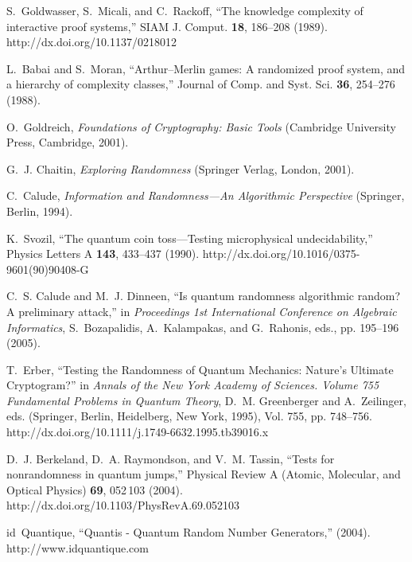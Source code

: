 \documentclass[12pt]{article}
\begin{document}
\begin{thebibliography}{10}
S.~Goldwasser, S.~Micali, and C.~Rackoff, \enquote{The knowledge complexity of
  interactive proof systems,} SIAM J. Comput. {\bf 18}, 186--208 (1989).
\newline http://dx.doi.org/10.1137/0218012

L.~Babai and S.~Moran, \enquote{Arthur--Merlin games: A randomized proof
  system, and a hierarchy of complexity classes,} Journal of Comp. and Syst.
  Sci. {\bf 36}, 254--276 (1988).

O.~Goldreich, {\em Foundations of Cryptography: Basic Tools\/} (Cambridge
  University Press, Cambridge, 2001).

G.~J. Chaitin, {\em Exploring Randomness\/} (Springer Verlag, London, 2001).

C.~Calude, {\em Information and Randomness---An Algorithmic Perspective\/}
  (Springer, Berlin, 1994).

K.~Svozil, \enquote{The quantum coin toss---Testing microphysical
  undecidability,} Physics Letters A {\bf 143}, 433--437 (1990).
\newline http://dx.doi.org/10.1016/0375-9601(90)90408-G

C.~S. Calude and M.~J. Dinneen, \enquote{Is quantum randomness algorithmic
  random? A preliminary attack,} in {\em Proceedings 1st International
  Conference on Algebraic Informatics\/}, S.~Bozapalidis, A.~Kalampakas, and
  G.~Rahonis, eds.,  pp. 195--196 (2005).

T.~Erber, \enquote{Testing the Randomness of Quantum Mechanics: Nature's
  Ultimate Cryptogram?} in {\em Annals of the New York Academy of Sciences.
  {V}olume 755 Fundamental Problems in Quantum Theory\/}, D.~M. Greenberger and
  A.~Zeilinger, eds.  (Springer, Berlin, Heidelberg, New York, 1995), Vol. 755,
  pp. 748--756.
\newline http://dx.doi.org/10.1111/j.1749-6632.1995.tb39016.x

D.~J. Berkeland, D.~A. Raymondson, and V.~M. Tassin, \enquote{Tests for
  nonrandomness in quantum jumps,} Physical Review A (Atomic, Molecular, and
  Optical Physics) {\bf 69}, 052\,103 (2004).
\newline http://dx.doi.org/10.1103/PhysRevA.69.052103

id~Quantique, \enquote{Quantis - Quantum Random Number Generators,}  (2004).
\newline http://www.idquantique.com


\end{thebibliography}
\end{document}
